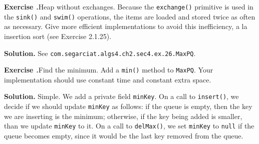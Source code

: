 \documentclass[12pt, a4paper]{article}
\newenvironment{ex}[2][Exercise]
{\par\medskip\noindent \textbf{#1 #2.}}
{\medskip}
\newenvironment{sol}[1][Solution]
{\par\medskip\noindent \textbf{#1.} }
{\medskip}
\begin{document}
	\begin{ex}{26}
		\emph{Heap without exchanges}. Because the \texttt{exchange()} primitive is used
		in the \texttt{sink()} and \texttt{swim()} operations, the items are loaded
		and stored twice as often as necessary. Give more efficient implementations
		to avoid this inefficiency, a la insertion sort (see Exercise 2.1.25).
	\end{ex}
	\begin{sol}
		See \texttt{com.segarciat.algs4.ch2.sec4.ex.26.MaxPQ}.
	\end{sol}
	\begin{ex}{27}
		\emph{Find the minimum}. Add a \texttt{min()} method to \texttt{MaxPQ}. Your
		implementation should use constant time and constant extra space.
	\end{ex}
	\begin{sol}
		Simple. We add a private field \texttt{minKey}. On a call to \texttt{insert()},
		we decide if we should update \texttt{minKey} as follows: if the queue
		is empty, then the key we are inserting is the minimum; otherwise, if
		the key being added is smaller, than we update \texttt{minKey} to it.
		On a call to \texttt{delMax()}, we set \texttt{minKey} to \texttt{null}
		if the queue becomes empty, since it would be the last key removed
		from the queue.
	\end{sol}
	\pagebreak
	\printbibliography
\end{document}
